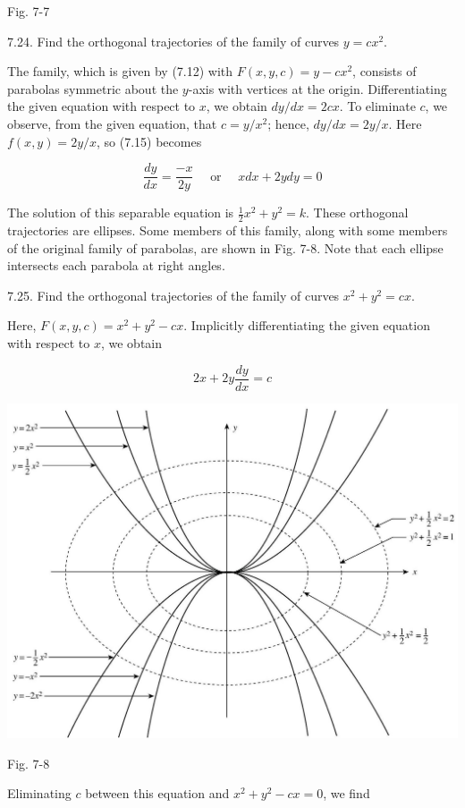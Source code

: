 \documentclass[10pt]{article}
\begin{document}
Fig. 7-7

7.24. Find the orthogonal trajectories of the family of curves $y=c x^{2}$.

The family, which is given by (7.12) with $F(x, y, c)=y-c x^{2}$, consists of parabolas symmetric about the $y$-axis with vertices at the origin. Differentiating the given equation with respect to $x$, we obtain $d y / d x=2 c x$. To eliminate $c$, we observe, from the given equation, that $c=y / x^{2}$; hence, $d y / d x=2 y / x$. Here $f(x, y)=2 y / x$, so (7.15) becomes

$$
\frac{d y}{d x}=\frac{-x}{2 y} \quad \text { or } \quad x d x+2 y d y=0
$$

The solution of this separable equation is $\frac{1}{2} x^{2}+y^{2}=k$. These orthogonal trajectories are ellipses. Some members of this family, along with some members of the original family of parabolas, are shown in Fig. 7-8. Note that each ellipse intersects each parabola at right angles.

7.25. Find the orthogonal trajectories of the family of curves $x^{2}+y^{2}=c x$.

Here, $F(x, y, c)=x^{2}+y^{2}-c x$. Implicitly differentiating the given equation with respect to $x$, we obtain

$$
2 x+2 y \frac{d y}{d x}=c
$$

\begin{center}
\includegraphics[max width=\textwidth]{2024_04_03_5bb5b4275a64cb9887d1g-086}
\end{center}

Fig. 7-8

Eliminating $c$ between this equation and $x^{2}+y^{2}-c x=0$, we find
\end{document}
